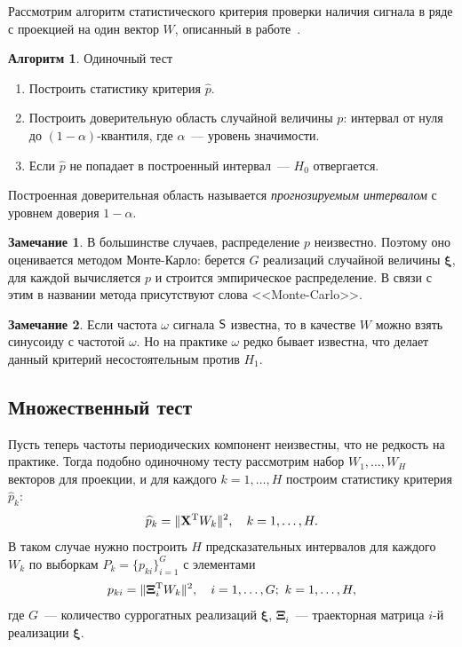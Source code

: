 \documentclass[specialist,
substylefile = spbu_report.rtx,
subf,href,colorlinks=true, 12pt]{disser}
\theoremstyle{definition}
\newtheorem{algorithm}{Алгоритм}
\newtheorem{remark}{Замечание}
\newcommand{\bfxi}{\boldsymbol{\xi}}
\begin{document}
Рассмотрим алгоритм статистического критерия проверки наличия сигнала в ряде с проекцией на один вектор $W$, описанный в работе~\cite{Golyandina_2023}.
\begin{algorithm}{Одиночный тест~\cite{Golyandina_2023}}
	\begin{enumerate}
		\item Построить статистику критерия $\widehat p$.
		\item Построить доверительную область случайной величины $p$: интервал от нуля до $(1-\alpha)$-квантиля, где $\alpha$~--- уровень значимости.
		\item Если $\widehat p$	не попадает в построенный интервал~--- $H_0$ отвергается.
	\end{enumerate}
\end{algorithm}
Построенная доверительная область называется \textit{прогнозируемым интервалом} с уровнем доверия $1-\alpha$.
\begin{remark}
В большинстве случаев, распределение $p$ неизвестно. Поэтому оно оценивается методом Монте-Карло: берется $G$ реализаций случайной величины $\boldsymbol\xi$, для каждой вычисляется $p$ и строится эмпирическое распределение. В связи с этим в названии метода присутствуют слова <<Monte-Carlo>>.
\end{remark}
\begin{remark}
Если частота $\omega$ сигнала $\mathsf{S}$ известна, то в качестве $W$ можно взять синусоиду с частотой $\omega$. Но на практике $\omega$ редко бывает известна, что делает данный критерий несостоятельным против $H_1$.
\end{remark}
\subsection{Множественный тест}\label{sect:multiple_test}
Пусть теперь частоты периодических компонент неизвестны, что не редкость на практике. Тогда подобно одиночному тесту рассмотрим набор $W_1,\ldots,W_H$ векторов для проекции, и для каждого $k=1,\ldots,H$ построим статистику критерия $\widehat p_k$:
\begin{equation}\label{eq:mc-ssa_statisctics}
	\widehat p_k = \|\mathbf{X}^{\mathrm{T}} W_k\|^2,\quad k=1,\ldots,H.
\end{equation}
В таком случае нужно построить $H$ предсказательных интервалов для каждого $W_k$ по выборкам $P_k=\{p_{ki}\}_{i=1}^G$ с элементами
\begin{equation}\label{eq:mc-ssa_h0}
	p_{ki}=\|\mathbf{\Xi}_i^\rmT W_k\|^2,\quad i=1,\ldots,G;\ k=1,\ldots,H,
\end{equation}
где $G$~--- количество суррогатных реализаций $\bfxi$, $\mathbf{\Xi}_i$~--- траекторная матрица $i$-й реализации $\bfxi$.
\end{document}
